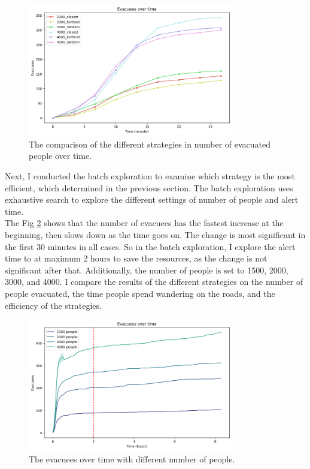 \documentclass[12pt]{article}
\begin{document}
\begin{figure}
    \centering
    \includegraphics[width=0.8\textwidth]{../images/evacuees_over_time.png}
    \caption{The comparison of the different strategies in number of evacuated people over time.}
    \label{fig:evacuees_over_time}
\end{figure}

Next, I conducted the batch exploration to examine which strategy is the most efficient, which determined in the previous section. The batch exploration uses exhaustive search to explore the different settings of number of people and alert time. \\

The Fig \ref{fig:alert_time_finding} shows that the number of evacuees has the fastest increase at the beginning, then slows down as the time goes on. The change is most significant in the first 30 minutes in all cases. So in the batch exploration, I explore the alert time to at maximum 2 hours to save the resources, as the change is not significant after that. Additionally, the number of people is set to 1500, 2000, 3000, and 4000. I compare the results of the different strategies on the number of people evacuated, the time people spend wandering on the roads, and the efficiency of the strategies. \\

\begin{figure}
    \centering
    \includegraphics[width=0.8\textwidth]{../images/alert_time_finding.png}
    \caption{The evacuees over time with different number of people.}
    \label{fig:alert_time_finding}
\end{figure}
\end{document}
